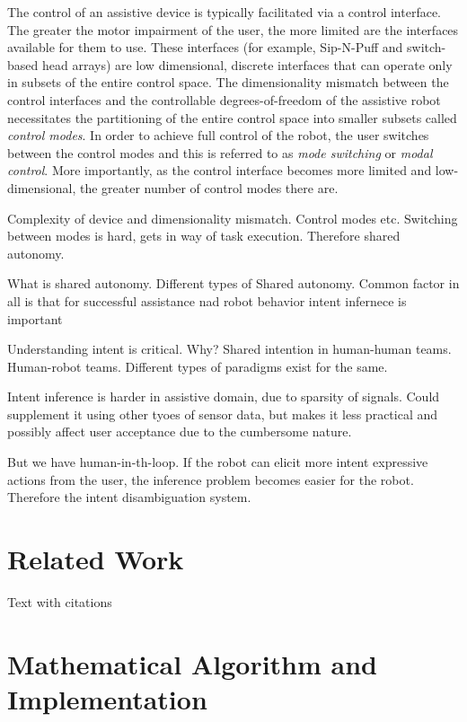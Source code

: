 The control of an assistive device is typically facilitated via a control interface. The greater the motor impairment of the user, the more limited are the interfaces available for them to use. These interfaces (for example, Sip-N-Puff and switch-based head arrays) are low dimensional, discrete interfaces that can operate only in subsets of the entire control space. 
The dimensionality mismatch between the control interfaces and the controllable degrees-of-freedom of the assistive robot necessitates the partitioning of the entire control space into smaller subsets called \textit{control modes}. In order to achieve full control of the robot, the user switches between the control modes and this is referred to as \textit{mode switching} or \textit{modal control}. More importantly, as the control interface becomes more limited and low-dimensional, the greater number of control modes there are. 




Complexity of device and dimensionality mismatch. Control modes etc. Switching between modes is hard, gets in way of task execution. Therefore shared autonomy. 

What is shared autonomy. Different types of Shared autonomy. Common factor in all is that for successful assistance nad robot behavior intent infernece is important 

Understanding intent is critical. Why? Shared intention in human-human teams. Human-robot teams. Different types of paradigms exist for the same. 

Intent inference is harder in assistive domain, due to sparsity of signals. Could supplement it using other tyoes of sensor data, but makes it less practical and possibly affect user acceptance due to the cumbersome nature. 

But we have human-in-th-loop. If the robot can elicit more intent expressive actions from the user, the inference problem becomes easier for the robot. Therefore the intent disambiguation system. 


\section{Related Work}\label{sec:1}
Text with citations \cite{McGeer01041990}
\section{Mathematical Algorithm and Implementation}\label{MAI}
